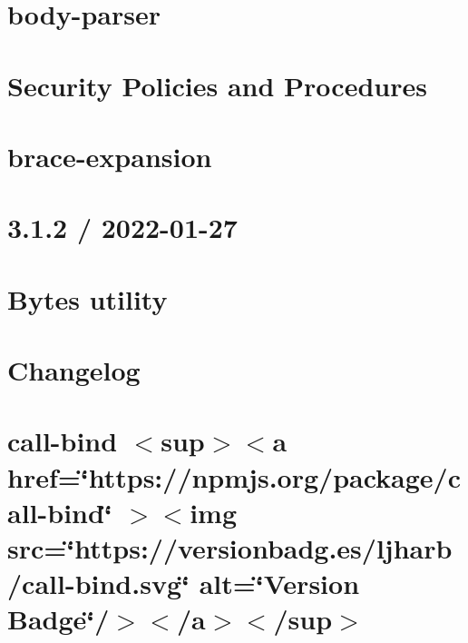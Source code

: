 \documentclass[twoside]{book}
\newcommand{\+}{\discretionary{\mbox{\scriptsize$\hookleftarrow$}}{}{}}
\begin{document}
\chapter{body-\/parser}
\label{md_src_nodejs_node_modules_body_parser_README}

\chapter{Security Policies and Procedures}
\label{md_src_nodejs_node_modules_body_parser_SECURITY}

\chapter{brace-\/expansion}
\label{md_src_nodejs_node_modules_brace_expansion_README}

\chapter{3.1.2 / 2022-\/01-\/27}
\label{md_src_nodejs_node_modules_bytes_History}

\chapter{Bytes utility}
\label{md_src_nodejs_node_modules_bytes_Readme}

\chapter{Changelog}
\label{md_src_nodejs_node_modules_call_bind_CHANGELOG}

\chapter{call-\/bind \texorpdfstring{$<$}{<}sup\texorpdfstring{$>$}{>}\texorpdfstring{$<$}{<}a href=\char`\"{}https\+://npmjs.\+org/package/call-\/bind\char`\"{} \texorpdfstring{$>$}{>}\texorpdfstring{$<$}{<}img src=\char`\"{}https\+://versionbadg.\+es/ljharb/call-\/bind.\+svg\char`\"{} alt=\char`\"{}\+Version Badge\char`\"{}/\texorpdfstring{$>$}{>}\texorpdfstring{$<$}{<}/a\texorpdfstring{$>$}{>}\texorpdfstring{$<$}{<}/sup\texorpdfstring{$>$}{>}}
\label{md_src_nodejs_node_modules_call_bind_README}

\end{document}
